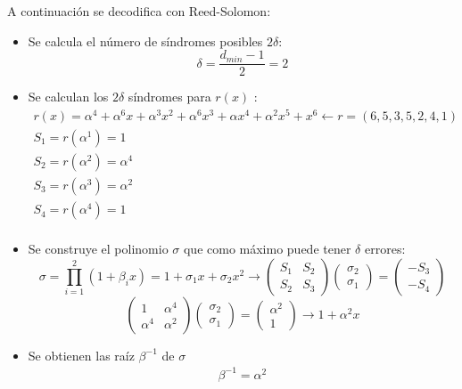 A continuación se decodifica con Reed-Solomon:
\begin{itemize}
	\item Se calcula el número de síndromes posibles \(2\delta\):
	\begin{equation}
		\delta= \dfrac{d_{min}-1}{2}=2
	\end{equation}
	\item Se calculan los $2\delta$ síndromes para \(r(x)\) :
	\begin{equation}
		\begin{array}{l}
			r(x)=\alpha^4+\alpha^6x+\alpha^3 x^2+\alpha^6x^3+\alpha x^4+\alpha^2x^5+x^6 \leftarrow r=(6,5,3,5,2,4,1)\\
			S_1=r(\alpha ^1)=1\\
			S_2=r(\alpha ^2)=\alpha^4\\
			S_3=r(\alpha ^3)=\alpha^2\\
			S_4=r(\alpha ^4)=1\\
		\end{array}
	\end{equation}
	
	\item Se construye el polinomio \(\sigma\) que como máximo puede tener \(\delta\) errores:
	\begin{equation}
		\sigma=\prod_{i=1}^{2} \left( 1 + \beta_ix  \right)=1+\sigma_1x+\sigma_2x^2\rightarrow\begin{pmatrix}
			S_1 & S_2\\
			S_2 & S_3
		\end{pmatrix}\begin{pmatrix}
		\sigma_2 \\
		\sigma_1
		\end{pmatrix}=\begin{pmatrix}
		-S_3 \\
		-S_4
		\end{pmatrix}
	\end{equation}
	\begin{equation}
		\begin{pmatrix}
			1 & \alpha^4\\
			\alpha^4 & \alpha^2
		\end{pmatrix}\begin{pmatrix}
			\sigma_2 \\
			\sigma_1
		\end{pmatrix}=\begin{pmatrix}
			\alpha^2 \\
			1
		\end{pmatrix} \rightarrow  1+\alpha^2x
	\end{equation}
	\item Se obtienen las raíz $\beta^{-1}$ de $\sigma$
	\begin{equation}
		\begin{array}{l}
			\beta^{-1}=\alpha^2\\
		\end{array}
	\end{equation}
	

\end{itemize}
